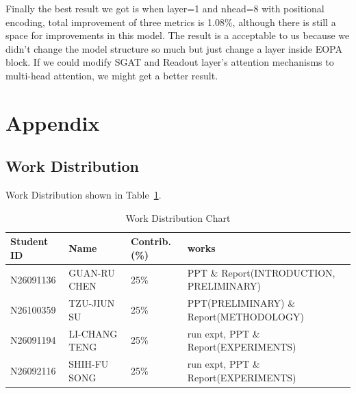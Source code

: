 \documentclass{article}
\begin{document}
Finally the best result we got is when layer=1 and nhead=8
with positional encoding, total improvement of three metrics is  1.08\%,
although there is still a space for improvements in this model.
The result is a acceptable to us because we didn't change the model structure
so much but just change a layer inside EOPA block.
If we could modify SGAT and Readout layer's attention mechanisms
to multi-head attention, we might get a better result.





\appendix

\section{Appendix}

\subsection{Work Distribution}

Work Distribution shown in Table~\ref{Work Distribution Chart}.

\begin{table}
    \caption{Work Distribution Chart}
    \label{Work Distribution Chart}
    \centering
    \begin{tabular}{llll}
        \toprule
        Student ID & Name          & Contrib.(\%) & works                                    \\
        \midrule
        N26091136  & GUAN-RU CHEN  & 25\%         & PPT \& Report(INTRODUCTION, PRELIMINARY) \\
        N26100359  & TZU-JIUN SU   & 25\%         & PPT(PRELIMINARY) \& Report(METHODOLOGY)  \\
        N26091194  & LI-CHANG TENG & 25\%         & run expt, PPT \& Report(EXPERIMENTS)     \\
        N26092116  & SHIH-FU SONG  & 25\%         & run expt, PPT \& Report(EXPERIMENTS)     \\
        \bottomrule
    \end{tabular}
\end{table}
\end{document}
